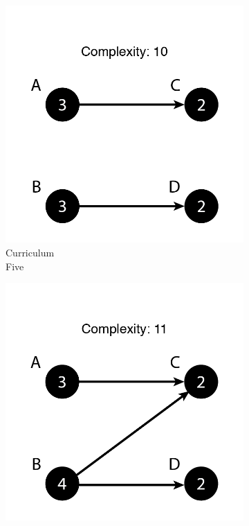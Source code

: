 \documentclass[botnum, fleqn]{unmeethesis}
\begin{document}
\begin{figure}
      \begin{subfigure}[h!]{.20\linewidth}
        \includegraphics[width=\linewidth]{./figures/Simple10.png}
        \caption{Curriculum \\ Five}\label{fig:simple10}
      \end{subfigure}
      \begin{subfigure}[h!]{.20\linewidth}
        \includegraphics[width=\linewidth]{./figures/Simple11.png}

\end{subfigure}
\end{figure}
\end{document}
